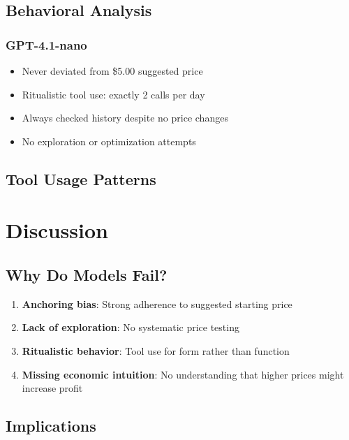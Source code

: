 \documentclass[11pt]{article}
\begin{document}
\subsection{Behavioral Analysis}

\subsubsection{GPT-4.1-nano}
\begin{itemize}
    \item Never deviated from \$5.00 suggested price
    \item Ritualistic tool use: exactly 2 calls per day
    \item Always checked history despite no price changes
    \item No exploration or optimization attempts
\end{itemize}


\subsection{Tool Usage Patterns}


\section{Discussion}

\subsection{Why Do Models Fail?}

\begin{enumerate}
    \item \textbf{Anchoring bias}: Strong adherence to suggested starting price
    \item \textbf{Lack of exploration}: No systematic price testing
    \item \textbf{Ritualistic behavior}: Tool use for form rather than function
    \item \textbf{Missing economic intuition}: No understanding that higher prices might increase profit
\end{enumerate}

\subsection{Implications}
\end{document}
